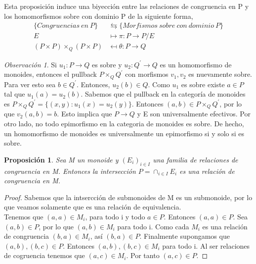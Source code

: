 \documentclass[12pt,spanish]{amsart}
\newtheorem{prop}[Theorem]{Proposición}
\theoremstyle{definition}
\theoremstyle{remark}
\newtheorem{obs}[Theorem]{Observación}
\begin{document}
Esta proposición induce una biyección entre las relaciones de congruencia en P y los homomorfismos sobre con dominio P de la siguiente forma,
\begin{equation*}
\begin{split}
\{Congruencias~en~P\} &\leftrightarrows \{Morfismos~sobre~con~dominio~P\} \\
E &\mapsto \pi:P \to P/E \\
(P\times P)\times_{Q}(P\times P) &\mapsfrom \theta: P \to Q
\end{split}
\end{equation*}

\begin{obs}
Si $u_{1}:P \to Q$ es sobre y $u_{2}:Q^{\prime} \to Q$ es un homomorfismo de monoides, entonces el pullback $P\times_{Q} Q^{\prime}$ con morfismos $v_{1},v_{2}$ es nuevamente sobre. \\
Para ver esto sea $b\in Q^{\prime}$. Entonces, $u_{2}(b)\in Q$. Como $u_{1}$ es sobre existe $a\in P$ tal que $u_{1}(a)=u_{2}(b)$. Sabemos que el pullback en la categoría de monoides es  $P\times_{Q} Q^{\prime}= \{(x,y):u_{1}(x)=u_{2}(y)\}$. Entonces $(a,b)\in P\times_{Q} Q^{\prime}$, por lo que $v_{2}(a,b)=b$. 
Esto implica que $P \to Q$ y E son universalmente efectivos. Por otro lado, no todo epimorfismo en la categoria de monoides es sobre. De hecho, un homomorfismo de monoides es universalmente un epimorfismo si y solo si es sobre. \\
\end{obs}

\begin{prop}
Sea M un monoide y $(E_{i})_{i\in I}$ una familia de relaciones de congruencia en M. Entonces la intersección $P=\cap_{i\in I}E_{i}$ es una relación de congruencia en M.
\end{prop}

\begin{proof}
Sabemos que la intsercción de submonoides de M es un submonoide, por lo que veamos solamente que es una relación de equivalencia. \\
Tenemos que $(a,a)\in M_{i}$, para todo i y todo $a\in P$. Entonces $(a,a)\in P$. Sea $(a,b)\in P$, por lo que $(a,b)\in M_{i}$ para todo i. Como cada $M_{i}$ es una relación de congruencia $(b,a)\in M_{i}$, así $(b,a)\in P$. Finalmente supongamos que $(a,b),(b,c)\in P$. Entonces $(a,b),(b,c)\in M_{i}$ para todo i. Al ser relaciones de cogruencia tenemos que $(a,c)\in M_{i}$. Por tanto $(a,c)\in P$.
\end{proof}
\end{document}
